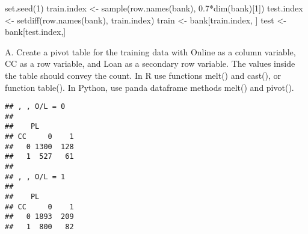 \documentclass[
]{article}
\newenvironment{Shaded}{\begin{snugshade}}{\end{snugshade}}
\newcommand{\DecValTok}[1]{\textcolor[rgb]{0.00,0.00,0.81}{#1}}
\newcommand{\FloatTok}[1]{\textcolor[rgb]{0.00,0.00,0.81}{#1}}
\newcommand{\FunctionTok}[1]{\textcolor[rgb]{0.00,0.00,0.00}{#1}}
\newcommand{\NormalTok}[1]{#1}
\newcommand{\OtherTok}[1]{\textcolor[rgb]{0.56,0.35,0.01}{#1}}
\newcommand{\SpecialCharTok}[1]{\textcolor[rgb]{0.00,0.00,0.00}{#1}}
\newcommand{\StringTok}[1]{\textcolor[rgb]{0.31,0.60,0.02}{#1}}
\begin{document}
\begin{Shaded}
\end{Shaded}

\begin{Shaded}
\begin{Highlighting}[]
\FunctionTok{set.seed}\NormalTok{(}\DecValTok{1}\NormalTok{)}
\NormalTok{train.index }\OtherTok{\textless{}{-}} \FunctionTok{sample}\NormalTok{(}\FunctionTok{row.names}\NormalTok{(bank), }\FloatTok{0.7}\SpecialCharTok{*}\FunctionTok{dim}\NormalTok{(bank)[}\DecValTok{1}\NormalTok{])  }
\NormalTok{test.index }\OtherTok{\textless{}{-}} \FunctionTok{setdiff}\NormalTok{(}\FunctionTok{row.names}\NormalTok{(bank), train.index) }
\NormalTok{train }\OtherTok{\textless{}{-}}\NormalTok{ bank[train.index, ]}
\NormalTok{test }\OtherTok{\textless{}{-}}\NormalTok{ bank[test.index,]}
\end{Highlighting}
\end{Shaded}

A. Create a pivot table for the training data with Online as a column
variable, CC as a row variable, and Loan as a secondary row variable.
The values inside the table should convey the count. In R use functions
melt() and cast(), or function table(). In Python, use panda dataframe
methods melt() and pivot().

\begin{Shaded}
\end{Shaded}

\begin{verbatim}
## , , O/L = 0
## 
##    PL
## CC     0    1
##   0 1300  128
##   1  527   61
## 
## , , O/L = 1
## 
##    PL
## CC     0    1
##   0 1893  209
##   1  800   82
\end{verbatim}
\end{document}
